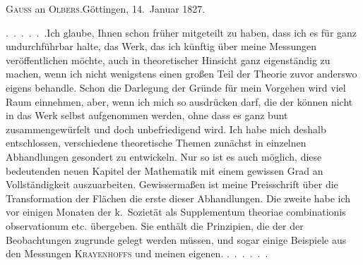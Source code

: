 \begin{center}
\textsc{Gauss} an \textsc{Olbers}.\quad Göttingen, 14.~Januar 1827.
\end{center}

\par\noindent\hspace*{\parindent}\mbox{.\ .\ .\ .\ .\ .}\quad Ich glaube, Ihnen schon früher mitgeteilt zu haben, dass ich es für ganz undurchführbar halte, das Werk, das ich künftig über meine Messungen veröffentlichen möchte, auch in theoretischer Hinsicht ganz eigenständig zu machen, wenn ich nicht wenigstens einen großen Teil der Theorie zuvor anderswo eigens behandle.
Schon die Darlegung der Gründe für mein Vorgehen wird viel Raum einnehmen, aber, wenn ich mich so ausdrücken darf, die  der  können nicht in das Werk selbst aufgenommen werden, ohne dass es ganz bunt zusammengewürfelt und doch unbefriedigend wird.
Ich habe mich deshalb entschlossen, verschiedene theoretische Themen zunächst in einzelnen Abhandlungen gesondert zu entwickeln. Nur so ist es auch möglich, diese bedeutenden neuen Kapitel der Mathematik mit einem gewissen Grad an Vollständigkeit auszuarbeiten.
Gewissermaßen ist meine Preisschrift über die Transformation der Flächen die erste dieser Abhandlungen. Die zweite habe ich vor einigen Monaten der k.\ Sozietät als Supplementum theoriae combinationis observationum etc. übergeben.
Sie enthält die Prinzipien, die der  der Beobachtungen zugrunde gelegt werden müssen, und sogar einige Beispiele aus den Messungen \textsc{Krayenhoffs} und meinen eigenen.\newline
\mbox{.\ .\ .\ .\ .\ .}\par
